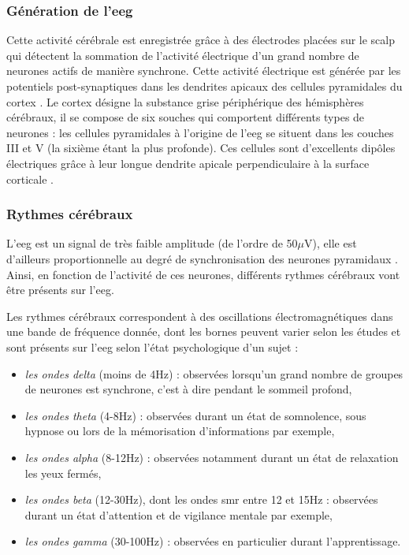\subsubsection{Génération de l'\gls{eeg}}

Cette activité cérébrale est enregistrée grâce à des électrodes placées sur le scalp qui détectent la sommation de l'activité électrique d'un grand nombre de neurones actifs de manière synchrone.
Cette activité électrique est générée par les potentiels post-synaptiques dans les dendrites apicaux des cellules pyramidales du cortex \citep{Hallez2007}. Le cortex désigne 
la substance grise périphérique des hémisphères cérébraux, il se compose de six souches qui comportent différents types de neurones : les cellules pyramidales à l'origine de l'\gls{eeg} 
se situent dans les couches III et V (la sixième étant la plus profonde). Ces cellules sont d'excellents dipôles électriques grâce à leur longue dendrite apicale perpendiculaire 
à la surface corticale \citep{Bekkers2011}. 

\subsubsection{Rythmes cérébraux}

L'\gls{eeg} est un signal de très faible amplitude (de l'ordre de 50$\mu$V), elle est d'ailleurs proportionnelle au degré de synchronisation des neurones pyramidaux \citep{Hallez2007}. 
Ainsi, en fonction de l'activité de ces neurones, différents rythmes cérébraux vont être présents sur l'\gls{eeg}. 

Les rythmes cérébraux correspondent à des oscillations électromagnétiques dans une bande de fréquence donnée, dont les bornes peuvent varier selon les études et sont présents sur l'\gls{eeg}
selon l'état psychologique d'un sujet \citep{Marzbani2016} :  
\renewcommand{\labelitemi}{$\bullet$}
\renewcommand{\labelitemii}{$\cdot$}
\begin{itemize}
\item \emph{les ondes delta} (moins de 4Hz) : observées lorsqu'un grand nombre de groupes de neurones est synchrone, c'est à dire pendant le sommeil profond,
\item \emph{les ondes theta} (4-8Hz) : observées durant un état de somnolence, sous hypnose ou lors de la mémorisation d'informations par exemple,
\item \emph{les ondes alpha} (8-12Hz) : observées notamment durant un état de relaxation les yeux fermés,
\item \emph{les ondes beta} (12-30Hz), dont les ondes \gls{smr} entre 12 et 15Hz : observées durant un état d'attention et de vigilance mentale par exemple,
\item \emph{les ondes gamma} (30-100Hz) : observées en particulier durant l'apprentissage.
\end{itemize}


